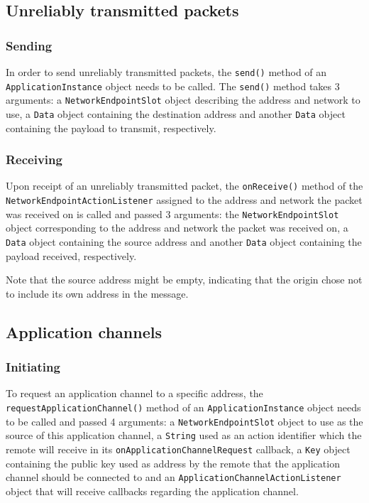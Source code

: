 \documentclass[a4paper,twoside,DIV=12,BCOR=1cm]{scrartcl}
\newcommand{\code}[1]{\texttt{#1}}
\begin{document}
\begin{multicols}{2}
\subsection*{Unreliably transmitted packets}
\subsubsection*{Sending}
In order to send unreliably transmitted packets, the \code{send()} method of an
\code{Application\-Instance} object needs to be called.
The \code{send()} method takes 3 arguments: a \code{Network\-Endpoint\-Slot} object
describing the address and network to use, a \code{Data} object containing the
destination address and another \code{Data} object containing the payload to
transmit, respectively.

\subsubsection*{Receiving}
Upon receipt of an unreliably transmitted packet, the \code{onReceive()} method
of the \code{Network\-Endpoint\-Action\-Listener} assigned to the address and network
the packet was received on is called and passed 3 arguments:
the \code{Network\-Endpoint\-Slot} object corresponding to the address and network
the packet was received on, a \code{Data} object containing the source address
and another \code{Data} object containing the payload received, respectively.

Note that the source address might be empty, indicating that the origin chose not
to include its own address in the message.

\subsection*{Application channels}
\subsubsection*{Initiating}
To request an application channel to a specific address, the
\code{request\-Application\-Channel()} method of an \code{Application\-Instance}
object needs to be called and passed 4 arguments: a \code{Network\-Endpoint\-Slot}
object to use as the source of this application channel, a \code{String} used as
an action identifier which the remote will receive in its
\code{on\-Application\-Channel\-Request} callback, a \code{Key} object containing the
public key used as address by the remote that the application channel should be
connected to and an \code{Application\-Channel\-Action\-Listener} object that will
receive callbacks regarding the application channel.


\end{multicols}
\end{document}
